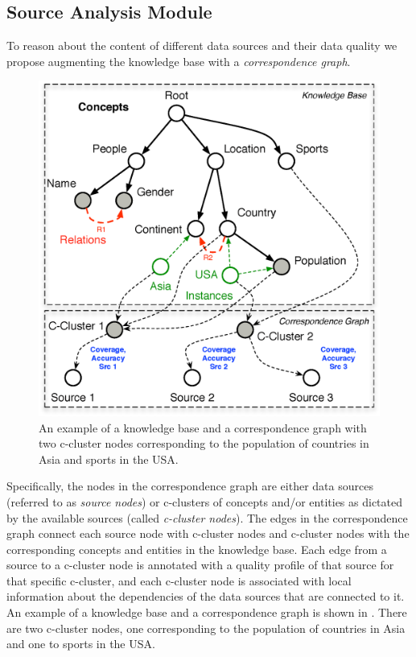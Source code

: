 \documentclass{sig-alternate}
\begin{document}
\subsection{Source Analysis Module}
To reason about the content of different data sources and their data quality we propose augmenting the knowledge base with a {\em correspondence graph}.
\begin{figure}
	\begin{center}
	\includegraphics[clip,scale=0.4]{fig/kgcg}
	\vspace{-5pt}
	\caption{An example of a knowledge base and a correspondence graph with two c-cluster nodes corresponding to the population of countries in Asia and sports in the USA.}
	\label{fig:kgcg}
	\end{center}
	\vspace{-30pt}
\end{figure}
Specifically, the nodes in the correspondence graph are either data sources (referred to as {\em source nodes}) or c-clusters of concepts and/or entities as dictated by the available sources (called {\em c-cluster nodes}). The edges in the correspondence graph connect each source node with c-cluster nodes and c-cluster nodes with the corresponding concepts and entities in the knowledge base.  Each edge from a source to a c-cluster node is annotated with a quality profile of that source for that specific c-cluster, and each c-cluster node is associated with local information about the dependencies of the data sources that are connected to it. An example of a knowledge base and a correspondence graph is shown in . There are two c-cluster nodes, one corresponding to the population of countries in Asia and one to sports in the USA. 
\end{document}
